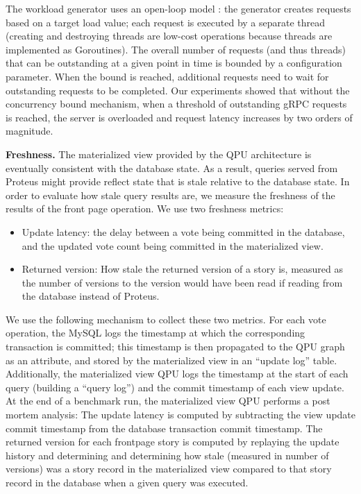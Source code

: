 The workload generator uses an open-loop model \cite{schroeder:cautionarytale}:
the generator creates requests based on a target load value;
each request is executed by a separate thread (creating and destroying threads are low-cost operations because threads are
implemented as Goroutines).
The overall number of requests (and thus threads) that can be outstanding at a given point in time is bounded by a
configuration parameter.
When the bound is reached, additional requests need to wait for outstanding requests to be completed.
Our experiments showed that without the concurrency bound mechanism, when a threshold of outstanding gRPC requests is reached,
the server is overloaded and request latency increases by two orders of magnitude.

\bigskip
\noindent
\textbf{Freshness.} The materialized view provided by the QPU architecture is eventually consistent with the database state.
As a result, queries served from Proteus might provide reflect state that is stale relative to the database state.
In order to evaluate how stale query results are, we measure the freshness of the results of the front page operation.
We use two freshness metrics:
\begin{itemize}
  \item Update latency: the delay between a vote being committed in the database, and the updated vote count being committed
  in the materialized view.
  \item Returned version: How stale the returned version of a story is, measured as the number of versions to the version
  would have been read if reading from the database instead of Proteus.
\end{itemize}

We use the following mechanism to collect these two metrics.
For each vote operation, the MySQL logs the timestamp at which the corresponding transaction is committed;
this timestamp is then propagated to the QPU graph as an attribute, and stored by the materialized view in an
``update log'' table.
Additionally, the materialized view QPU logs the timestamp at the start of each query (building a ``query log'')
and the commit timestamp of each view update.
At the end of a benchmark run, the materialized view QPU performs a post mortem analysis:
The update latency is computed by subtracting the view update commit timestamp from the database transaction commit
timestamp.
The returned version for each frontpage story is computed by replaying the update history and determining and determining
how stale (measured in number of versions) was a story record in the materialized view compared to that story record in the database
when a given query was executed.

